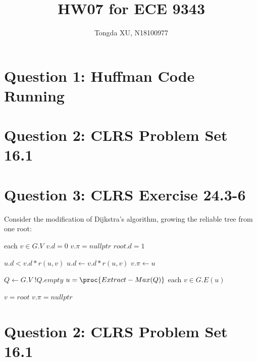 \documentclass[]{article}
\title{HW07 for ECE 9343}
\author{Tongda XU, N18100977}
\begin{document}
\maketitle

\section{Question 1: Huffman Code Running}

\section{Question 2: CLRS Problem Set 16.1}

\section{Question 3: CLRS Exercise 24.3-6}

Consider the modification of Dijkstra’s algorithm, growing the reliable tree from one root:

\begin{codebox}
	\li \For each $v \in G.V$
	\li \Do	$v.d = 0$
	\li 	$v.\pi = nullptr$ \End
	\li  $root.d = 1$
\end{codebox}

\begin{codebox}
	\li \If $u.d < v.d * r(u, v)$ 
	\li 	\Then $u.d \leftarrow v.d * r(u, v)$
	\li  		  $v.\pi \leftarrow u$ \End
\end{codebox}

\begin{codebox}
	\li {}
	\li $Q \leftarrow G.V$	
	\li \While $!Q.empty$
	\li \Do $u = \proc{Extract-Max(Q)}$
	\li \For each $v \in G.E(u)$
	\li \Do {}
\end{codebox}

\begin{codebox}
	\li \If $v = root$
	\li \Then \Return
	\li \Else
	\li \If $v.\pi = nullptr$
	\li \Then {} 
	\li \Else
	\li {}
	\li {}
\end{codebox}


\section{Question 2: CLRS Problem Set 16.1}
\end{document}
